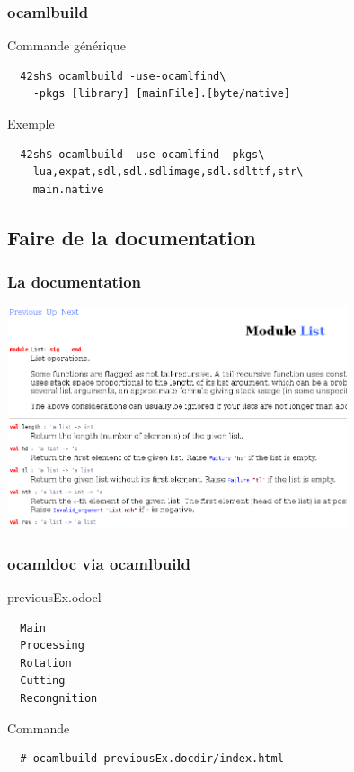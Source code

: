 \begin{frame}[fragile]
	\frametitle{ocamlbuild}
	\begin{block}{Commande générique}
		\begin{lstlisting}
  42sh$ ocamlbuild -use-ocamlfind\
    -pkgs [library] [mainFile].[byte/native]
		\end{lstlisting}
	\end{block}
	\begin{block}{Exemple}
		\begin{lstlisting}
  42sh$ ocamlbuild -use-ocamlfind -pkgs\
    lua,expat,sdl,sdl.sdlimage,sdl.sdlttf,str\
    main.native
		\end{lstlisting}
	\end{block}
\end{frame}

\subsection{Faire de la documentation} %
\begin{frame}
	\frametitle{La documentation}
	\begin{center}
		\includegraphics[width=10cm]{pics/doc.png}
	\end{center}
\end{frame}

\begin{frame}[fragile]
	\frametitle{ocamldoc via ocamlbuild}
	\begin{block}{previousEx.odocl}
		\begin{lstlisting}
  Main
  Processing
  Rotation
  Cutting
  Recongnition
		\end{lstlisting}
	\end{block}
	\begin{block}{Commande}
		\begin{lstlisting}
  # ocamlbuild previousEx.docdir/index.html
		\end{lstlisting}
	\end{block}
\end{frame}

